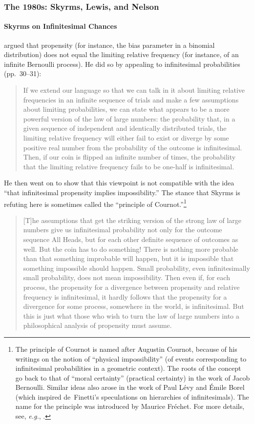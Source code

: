 \subsubsection*{The 1980s: Skyrms, Lewis, and Nelson}

\paragraph{Skyrms on Infinitesimal Chances}
\citet{Skyrms:1980} argued that propensity (for instance, the bias parameter in a binomial distribution) does not equal the limiting relative frequency (for instance, of an infinite Bernoulli process). He did so by appealing to infinitesimal probabilities (pp.~30--31):
\begin{quote}
If we extend our language so that we can talk in it about limiting relative frequencies in an infinite sequence of trials and make a few assumptions about limiting probabilities, we can state what appears to be a more powerful version of the law of large numbers: the probability that, in a given sequence of independent and identically distributed trials, the limiting relative frequency will either fail to exist or diverge by some positive real number from the probability of the outcome is infinitesimal. Then, if our coin is flipped an infinite number of times, the probability that the limiting relative frequency fails to be one-half is infinitesimal.
\end{quote}
He then went on to show that this viewpoint is not compatible with the idea ``that infinitesimal propensity implies impossibility.'' The stance that Skyrms is refuting here is sometimes called the ``principle of Cournot.''\footnote{\label{fn:Cournot}The principle of Cournot is named after Augustin Cournot, because of his writings on the notion of ``physical impossibility'' (of events corresponding to infinitesimal probabilities in a geometric context). The roots of the concept go back to that of ``moral certainty'' (practical certainty) in the work of Jacob Bernoulli. Similar ideas also arose in the work of Paul L{\'e}vy and {\'E}mile Borel (which inspired de~Finetti's speculations on hierarchies of infinitesimals). The name for the principle was introduced by Maurice Fr{\'e}chet. For more details, see, \textit{e.g.}, \citet{Shafer:2008}.}
\begin{quote}
[T]he assumptions that get the striking version of the strong law of large numbers give us infinitesimal probability not only for the outcome sequence All Heads, but for each other definite sequence of outcomes as well. But the coin has to do something! There is nothing more probable than that something improbable will happen, but it is impossible that something impossible should happen. Small probability, even infinitesimally small probability, does not mean impossibility. Then even if, for each process, the propensity for a divergence between propensity and relative frequency is infinitesimal, it hardly follows that the propensity for a divergence for some process, somewhere in the world, is infinitesimal. But this is just what those who wish to turn the law of large numbers into a philosophical analysis of propensity must assume.
\end{quote}
